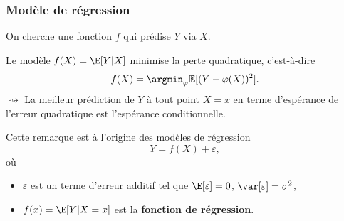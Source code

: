 \documentclass{beamer}\usepackage[]{graphicx}\usepackage[]{color}
\begin{document}
\begin{frame}
  \frametitle{Modèle de régression}

  On cherche une fonction $f$ qui prédise $Y$ via $X$.

  \begin{proposition}  Le  modèle  $f(X)=\E[Y|X]$  minimise  la  perte
    quadratique, c'est-à-dire
    \begin{equation*}
      f(X)   =    \argmin_{\varphi} \mathbb{E}[(Y - \varphi(X))^2].
    \end{equation*}
    $\rightsquigarrow$ La meilleur prédiction de $Y$ à tout point $X = x$
    en terme d'espérance de l'erreur quadratique est l'espérance conditionnelle.
  \end{proposition}

  \vfill

  Cette remarque est à l'origine des modèles de régression
    \begin{equation*}
      Y = f(X) + \varepsilon,
    \end{equation*}
    où
    \begin{itemize}
    \item $\varepsilon$ est un terme d'erreur additif tel que 
      $\E[\varepsilon]=0$, $\var[\varepsilon]=\sigma^2$,
    \item $f(x) = \E[Y | X = x]$ est la \alert{\bf fonction de régression}.
    \end{itemize}

\end{frame}
\end{document}
